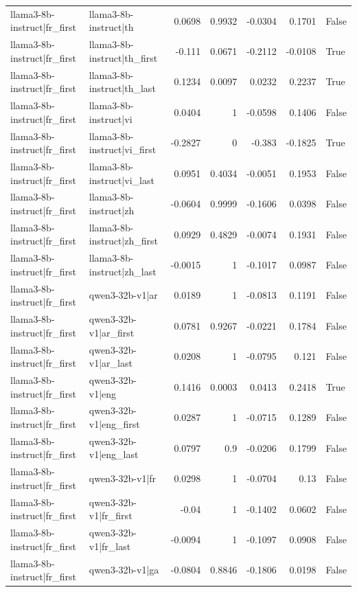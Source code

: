 \begin{table}
\begin{tabular}{l l r r r r l}
llama3-8b-instruct|fr_first & llama3-8b-instruct|th & 0.0698 & 0.9932 & -0.0304 & 0.1701 & False \\
llama3-8b-instruct|fr_first & llama3-8b-instruct|th_first & -0.111 & 0.0671 & -0.2112 & -0.0108 & True \\
llama3-8b-instruct|fr_first & llama3-8b-instruct|th_last & 0.1234 & 0.0097 & 0.0232 & 0.2237 & True \\
llama3-8b-instruct|fr_first & llama3-8b-instruct|vi & 0.0404 & 1 & -0.0598 & 0.1406 & False \\
llama3-8b-instruct|fr_first & llama3-8b-instruct|vi_first & -0.2827 & 0 & -0.383 & -0.1825 & True \\
llama3-8b-instruct|fr_first & llama3-8b-instruct|vi_last & 0.0951 & 0.4034 & -0.0051 & 0.1953 & False \\
llama3-8b-instruct|fr_first & llama3-8b-instruct|zh & -0.0604 & 0.9999 & -0.1606 & 0.0398 & False \\
llama3-8b-instruct|fr_first & llama3-8b-instruct|zh_first & 0.0929 & 0.4829 & -0.0074 & 0.1931 & False \\
llama3-8b-instruct|fr_first & llama3-8b-instruct|zh_last & -0.0015 & 1 & -0.1017 & 0.0987 & False \\
llama3-8b-instruct|fr_first & qwen3-32b-v1|ar & 0.0189 & 1 & -0.0813 & 0.1191 & False \\
llama3-8b-instruct|fr_first & qwen3-32b-v1|ar_first & 0.0781 & 0.9267 & -0.0221 & 0.1784 & False \\
llama3-8b-instruct|fr_first & qwen3-32b-v1|ar_last & 0.0208 & 1 & -0.0795 & 0.121 & False \\
llama3-8b-instruct|fr_first & qwen3-32b-v1|eng & 0.1416 & 0.0003 & 0.0413 & 0.2418 & True \\
llama3-8b-instruct|fr_first & qwen3-32b-v1|eng_first & 0.0287 & 1 & -0.0715 & 0.1289 & False \\
llama3-8b-instruct|fr_first & qwen3-32b-v1|eng_last & 0.0797 & 0.9 & -0.0206 & 0.1799 & False \\
llama3-8b-instruct|fr_first & qwen3-32b-v1|fr & 0.0298 & 1 & -0.0704 & 0.13 & False \\
llama3-8b-instruct|fr_first & qwen3-32b-v1|fr_first & -0.04 & 1 & -0.1402 & 0.0602 & False \\
llama3-8b-instruct|fr_first & qwen3-32b-v1|fr_last & -0.0094 & 1 & -0.1097 & 0.0908 & False \\
llama3-8b-instruct|fr_first & qwen3-32b-v1|ga & -0.0804 & 0.8846 & -0.1806 & 0.0198 & False \\

\end{tabular}
\end{table}
